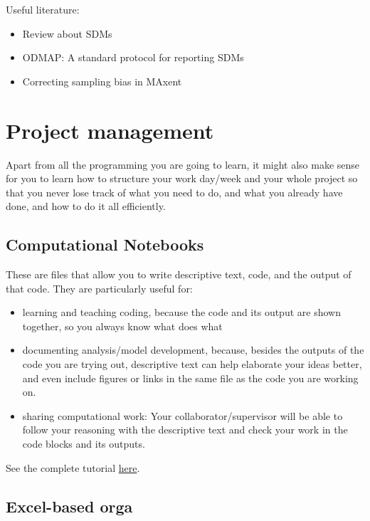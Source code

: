 \documentclass[
]{book}
\providecommand{\tightlist}{%
  \setlength{\itemsep}{0pt}\setlength{\parskip}{0pt}}
\begin{document}
Useful literature:

\begin{itemize}
\item
  Review about SDMs \citep{hao2019}
\item
  ODMAP: A standard protocol for reporting SDMs \citep{zurell2020}
\item
  Correcting sampling bias in MAxent \citep{kramer-schadt2013}
\end{itemize}

\chapter{Project management}\label{project-management}

Apart from all the programming you are going to learn, it might also
make sense for you to learn how to structure your work day/week and your
whole project so that you never lose track of what you need to do, and
what you already have done, and how to do it all efficiently.

\section{Computational Notebooks}\label{computational-notebooks}

These are files that allow you to write descriptive text, code, and the
output of that code. They are particularly useful for:

\begin{itemize}
\tightlist
\item
  learning and teaching coding, because the code and its output are
  shown together, so you always know what does what
\item
  documenting analysis/model development, because, besides the outputs
  of the code you are trying out, descriptive text can help elaborate
  your ideas better, and even include figures or links in the same
  file as the code you are working on.
\item
  sharing computational work: Your collaborator/supervisor will be
  able to follow your reasoning with the descriptive text and check
  your work in the code blocks and its outputs.
\end{itemize}

See the complete tutorial
\href{https://github.com/FellowsFreiesWissen/computational_notebooks}{here}.

\section{Excel-based orga}\label{excel-based-orga}
\end{document}
